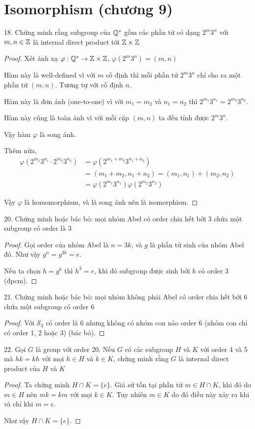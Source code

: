 \section{Isomorphism (chương 9)}

18. Chứng minh rằng subgroup của $\mathbb{Q}^*$ gồm các phần tử có dạng $2^m 3^n$ với $m, n \in \mathbb{Z}$ là internal direct product tới $\mathbb{Z} \times \mathbb{Z}$

\begin{proof}
    Xét ánh xạ $\varphi: \mathbb{Q}^* \rightarrow \mathbb{Z} \times \mathbb{Z}$, $\varphi(2^m 3^n) = (m, n)$

    Hàm này là well-defined vì với $m$ cố định thì mỗi phần tử $2^m 3^n$ chỉ cho ra một phần tử $(m, n)$. Tương tự với cố định $n$.

    Hàm này là đơn ánh (one-to-one) vì với $m_1 = m_2$ và $n_1 = n_2$ thì $2^{m_1} 3^{n_1} = 2^{m_2} 3^{n_2}$.

    Hàm này cũng là toàn ánh vì với mỗi cặp $(m, n)$ ta đều tính được $2^m 3^n$.

    Vậy hàm $\varphi$ là song ánh.

    Thêm nữa, 
    \begin{align*}
        \varphi(2^{m_1} 3^{n_1} \cdot 2^{m_2} 3^{n_2})& = \varphi(2^{m_1 + m_2} 3^{n_1 + n_2}) \\
        & = (m_1 + m_2, n_1 + n_2) = (m_1, n_1) + (m_2, n_2) \\
        & = \varphi(2^{m_1} 3^{n_1}) \varphi(2^{m_2} 3^{n_2})
    \end{align*}

    Vậy $\varphi$ là homomorphism, và là song ánh nên là isomorphism.

    \end{proof}

20. Chứng minh hoặc bác bỏ: mọi nhóm Abel có order chia hết bởi 3 chứa một subgroup có order là 3

\begin{proof}
    Gọi order của nhóm Abel là $n=3k$, và $g$ là phần tử sinh của nhóm Abel đó. Như vậy $g^n = g^{3k} = e$.

    Nếu ta chọn $h = g^k$ thì $h^3 = e$, khi đó subgroup được sinh bởi $h$ có order 3 (đpcm).
\end{proof}

21. Chứng minh hoặc bác bỏ: mọi nhóm không phải Abel có order chia hết bởi 6 chứa một subgroup có order 6

\begin{proof}
    Với $\mathcal{S}_3$ có order là 6 nhưng không có nhóm con nào order 6 (nhóm con chỉ có order 1, 2 hoặc 3) (bác bỏ).
\end{proof}

22. Gọi $G$ là group với order 20. Nếu $G$ có các subgroup $H$ và $K$ với order 4 và 5 mà $hk=kh$ với mọi $h \in H$ và $k \in K$, chứng minh rằng $G$ là internal direct product của $H$ và $K$

\begin{proof}
    Ta chứng minh $H \cap K = \{ e \}$. Giả sử tồn tại phần tử $m \in H \cap K$, khi đó do $m \in H$ nên $mk = km$ với mọi $k \in K$. Tuy nhiên $m \in K$ do đó điều này xảy ra khi và chỉ khi $m = e$.

    Như vậy $H \cap K = \{ e \}$.
\end{proof}